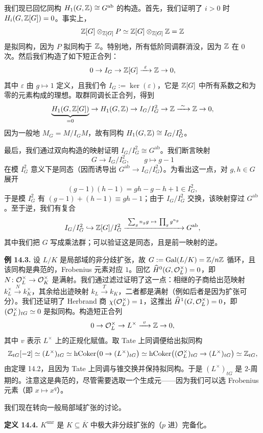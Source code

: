 我们现已回忆同构 $H_{1}(G,\mathbb{Z})\cong G^{\mathrm{ab}}$ 的构造。首先，我们证明了 $i>0$ 时 $H_{i}(G,\mathbb{Z}[G])=0$。事实上，
\[
\mathbb{Z}[G]\otimes_{\mathbb{Z}[G]}P\simeq\mathbb{Z}[G]\otimes_{\mathbb{Z}[G]}\mathbb{Z}=\mathbb{Z}
\]
是拟同构，因为 $P$ 拟同构于 $\mathbb{Z}$。特别地，所有低阶同调群消没，因为 $\mathbb{Z}$ 在 $0$ 次。然后我们构造了如下短正合列：
\[
0\to I_{G}\to\mathbb{Z}[G]\xrightarrow{\ \varepsilon\ }\mathbb{Z}\to 0,
\]
其中 $\varepsilon$ 由 $g\mapsto 1$ 定义，且我们令 $I_{G}:=\ker(\varepsilon)$，它是 $\mathbb{Z}[G]$ 中所有系数之和为零的元素构成的理想。取群同调长正合列，得到
\[
\underbrace{H_{1}(G,\mathbb{Z}[G])}_{=0}\to H_{1}(G,\mathbb{Z})\to I_{G}/I_{G}^{2}\to\mathbb{Z}\xrightarrow{\ \sim\ }\mathbb{Z}\to 0,
\]
因为一般地 $M_{G}=M/I_{G}M$，故有同构 $H_{1}(G,\mathbb{Z})\cong I_{G}/I_{G}^{2}$。

最后，我们通过双向构造的映射证明 $I_{G}/I_{G}^{2}\cong G^{\mathrm{ab}}$。我们断言映射
\[
G\longrightarrow I_{G}/I_{G}^{2},\qquad g\mapsto g-1
\]
在模 $I_{G}^{2}$ 意义下是同态（因而诱导出 $G^{\mathrm{ab}}\to I_{G}/I_{G}^{2}$）。为看出这一点，对 $g,h\in G$ 展开
\[
(g-1)(h-1)=gh-g-h+1\in I_{G}^{2},
\]
于是模 $I_{G}^{2}$ 有 $(g-1)+(h-1)\equiv gh-1$；由于 $I_{G}/I_{G}^{2}$ 交换，该映射穿过 $G^{\mathrm{ab}}$。至于逆，我们有复合
\[
I_{G}/I_{G}^{2}\hookrightarrow\Z[G]/I_{G}^{2}\xrightarrow{\ \sum_{g}n_{g}g\ \mapsto\ \prod_{g}g^{n_{g}}\ }G^{\mathrm{ab}},
\]
其中我们把 $G$ 写成乘法群；可以验证这是同态，且是前一映射的逆。

\textbf{例 14.3.} 设 $L/K$ 是局部域的非分歧扩张，故 $G:=\operatorname{Gal}(L/K)=\mathbb{Z}/n\mathbb{Z}$ 循环，且该同构是典范的，Frobenius 元素对应 $1$。回忆 $\widehat{H}^{0}(G,\mathcal{O}_{L}^{\times})=0$，即 $N\colon\mathcal{O}_{L}^{\times}\to\mathcal{O}_{K}^{\times}$ 是满射。我们通过滤过证明了这一点：相继的子商给出范映射 $k_{L}^{\times}\xrightarrow{\ N\ }k_{K}^{\times}$，其余给出迹映射 $k_{L}\xrightarrow{\ T\ }k_{K}$，二者都是满射（例如后者是因为扩张可分）。我们还证明了 Herbrand 商 $\chi(\mathcal{O}_{L}^{\times})=1$，这推出 $\widehat{H}^{1}(G,\mathcal{O}_{L}^{\times})=0$，即 $(\mathcal{O}_{L}^{\times})_{tG}\simeq 0$ 是拟同构。构造短正合列
\[
0\to\OK_{L}^{\times}\to L^{\times}\xrightarrow{\ v\ }\Z\to 0,
\]
其中 $v$ 表示 $L^{\times}$ 上的正规化赋值。取 Tate 上同调便给出拟同构
\[
\mathbb{Z}_{tG}[-2]\simeq(L^{\times})_{tG}\simeq\operatorname{hCoker}\bigl(0\to(L^{\times})_{tG}\bigr)\simeq\operatorname{hCoker}\bigl((\mathcal{O}_{L}^{\times})_{tG}\to(L^{\times})_{tG}\bigr)\simeq\mathbb{Z}_{tG},
\]
由定理 14.2，且因为 Tate 上同调与锥交换并保持拟同构。于是 $(L^{\times})_{tG}$ 是 $2$-周期的。注意这是典范的，尽管需要选取一个生成元——因为我们可以选 Frobenius 元素（即 $x\mapsto x^{q}$）。

我们现在转向一般局部域扩张的讨论。

\textbf{定义 14.4.} $K^{\mathrm{unr}}$ 是 $K\subseteq\overline{K}$ 中极大非分歧扩张的（$p$ 进）完备化。

